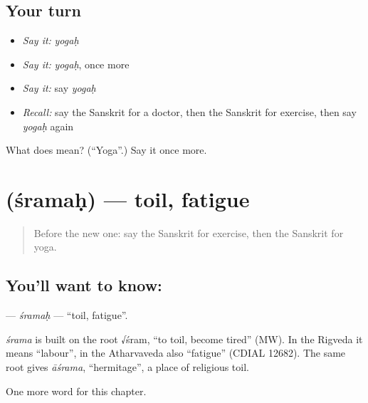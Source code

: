 \subsection*{Your turn}
\begin{itemize}
\raggedright
  \item \emph{Say it:} \emph{yogaḥ}
  \item \emph{Say it:} \emph{yogaḥ}, once more
  \item \emph{Say it:} say \emph{yogaḥ}
  \item \emph{Recall:} say the Sanskrit for a doctor, then the Sanskrit for exercise, then say \emph{yogaḥ} again
\end{itemize}

\begin{tcolorbox}[breakable,colback=teal!4,colframe=teal!35!black,title={Before you move on}]
What does  mean? (\textquotedblleft{}Yoga\textquotedblright{}.) Say it once more.
\end{tcolorbox}
\section[\texorpdfstring{\sk{श्रमः} (śramaḥ)}{श्रमः (śramaḥ)}]{ (śramaḥ) — toil, fatigue}

\label{lesson:SA-C211-sramah}



\begin{quote}
Before the new one: say the Sanskrit for exercise, then the Sanskrit for yoga.
\end{quote}

\subsection*{You'll want to know: }
\textbf{} — \emph{śramaḥ} — \textquotedblleft{}toil, fatigue\textquotedblright{}.

\begin{cousinweb}
\emph{śrama} is built on the root √śram, \textquotedblleft{}to toil, become tired\textquotedblright{} (MW). In the Rigveda it means \textquotedblleft{}labour\textquotedblright{}, in the Atharvaveda also \textquotedblleft{}fatigue\textquotedblright{} (CDIAL 12682). The same root gives \emph{āśrama}, \textquotedblleft{}hermitage\textquotedblright{}, a place of religious toil.
\end{cousinweb}

\begin{grammarlens}[title={What you've built}]
One more word for this chapter.
\end{grammarlens}

